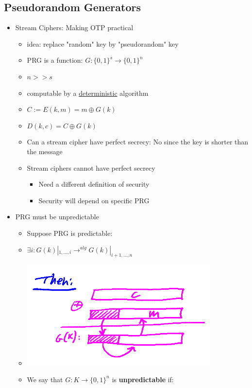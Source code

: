 \documentclass[]{article}
\begin{document}
\subsection{Pseudorandom Generators}
\begin{itemize}
	\item Stream Ciphers: Making OTP practical
	\begin{itemize}
		\item idea: replace "random" key by "pseudorandom" key
		\item PRG is a function: $G: \{0,1\}^{s} \rightarrow \{0,1\}^{n}$
		\item $n >> s$
		\item computable by a \underline{deterministic} algorithm
		\item $C := E(k,m) = m \oplus G(k)$
		\item $D(k,c) = C \oplus G(k)$
		\item Can a stream cipher have perfect secrecy: No since the key is shorter than the message
		\item Stream ciphers cannot have perfect secrecy
		\begin{itemize}
			\item Need a different definition of security
			\item Security will depend on specific PRG
		\end{itemize}
	\end{itemize}
	\item PRG must be unpredictable
	\begin{itemize}
		\item Suppose PRG is predictable:
		\item $\exists i: G(k) |_{1,...,i} \rightarrow^{alg} G(k) |_{i+1,...,n} $
		\item \includegraphics[scale=0.5]{Selection_016}
		\item We say that $G: K \rightarrow \{0,1\}^{n}$ is \textbf{unpredictable} if:
		\begin{itemize}

\end{itemize}
\end{itemize}
\end{itemize}
\end{document}
